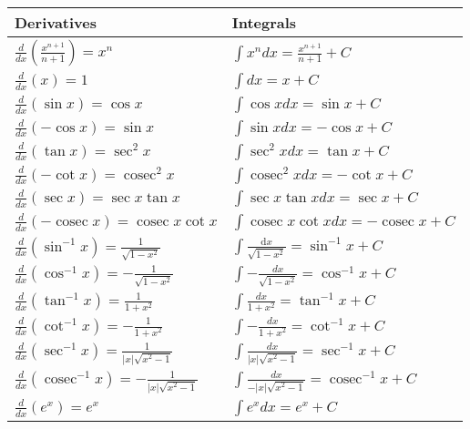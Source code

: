 \begin{table}[H]
	\centering
	\renewcommand{\arraystretch}{1.7}
	\begin{tabularx}{0.8\textwidth} { 
			| >{\centering\arraybackslash}X 
			| >{\centering\arraybackslash}X |  }
		\hline
		\rowcolor{ocrel}\large \textbf{Derivatives} & \large \textbf{Integrals} \\
		\hline
		$\frac{d}{d x}\left(\frac{x^{n +1}}{n+1}\right)=x^{n} $ & $\int x^{n} d x=\frac{x^{n+1}}{n+1}+C$   \\
		\hline
		$ \frac{d}{d x}(x)=1 $& $ \int d x=x+C $\\ \hline
		$ \frac{d}{d x}(\sin x)=\cos x$& $\int \cos x d x=\sin x+C $\\ \hline
		$\frac{d}{d x}(-\cos x)=\sin x $& $ \int \sin x d x=-\cos x+C$\\ \hline
		$\frac{d}{d x}(\tan x)=\sec ^{2} x  $& $ \int \sec ^{2} x d x=\tan x+C $\\ \hline
		$ \frac{d}{d x}(-\cot x)=\operatorname{cosec}^{2} x$& $ \int \operatorname{cosec}^{2} x d x=-\cot x+C $\\ \hline
		$ \frac{d}{d x}(\sec x)=\sec x \tan x $& $ \int \sec x \tan x d x=\sec x+C $\\ \hline
		$\frac{d}{d x}(-\operatorname{cosec} x)=\operatorname{cosec} x \cot x $& $\int \operatorname{cosec} x \cot x d x=-\operatorname{cosec} x+C $\\ \hline
		$ \frac{d}{d x}\left(\sin ^{-1} x\right)=\frac{1}{\sqrt{1-x^{2}}} $& $\int \frac{\mathrm{d} x}{\sqrt{1-x^{2}}}=\sin ^{-1} x+C $\\ \hline
		$\frac{d}{d x}\left(\cos ^{-1} x\right)=-\frac{1}{\sqrt{1-x^{2}}}  $& $\int-\frac{d x}{\sqrt{1-x^{2}}}=\cos ^{-1} x+C  $\\ \hline
		$ \frac{d}{d x}\left(\tan ^{-1} x\right)=\frac{1}{1+x^{2}} $& $\int \frac{d x}{1+x^{2}}=\tan ^{-1} x+C $\\ \hline
		$ \frac{d}{d x}\left(\cot ^{-1} x\right)=-\frac{1}{1+x^{2}} $& $\int-\frac{d x}{1+x^{2}}=\cot ^{-1} x+C $\\ \hline
		$\frac{d}{d x}\left(\sec ^{-1} x\right)=\frac{1}{|x| \sqrt{x^{2}-1}}  $& $\int \frac{d x}{|x| \sqrt{x^{2}-1}}=\sec ^{-1} x+C $\\ \hline
		$ \frac{d}{d x}\left(\operatorname{cosec}^{-1} x\right)=-\frac{1}{|x| \sqrt{x^{2}-1}}$& $\int \frac{d x}{-|x| \sqrt{x^{2}-1}}=\operatorname{cosec}^{-1} x+C  $\\ \hline
		$ \frac{d}{d x}\left(e^{x}\right)=e^{x} $& $ \int e^{x} d x=e^{x}+C $\\ \hline

\end{tabularx}
\end{table}
